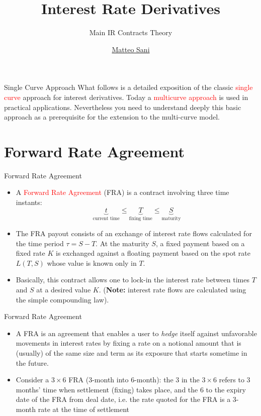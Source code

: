 \documentclass{beamer}
\title{Interest Rate Derivatives}
\subtitle{Main IR Contracts Theory}
\author{\href{mailto:matteo.sani@unisi.it}{Matteo Sani}}
\begin{document}
\begin{frame}[plain]
  \maketitle
\end{frame}

\begin{frame}{Single Curve Approach}
  What follows is a detailed exposition of the classic \textcolor{red}{single curve}
  approach for interest derivatives. Today a \textcolor{red}{multicurve approach} is
  used in practical applications. Nevertheless you need to understand
  deeply this basic approach as a prerequisite for the extension to the
  multi-curve model.
\end{frame}          

\section{Forward Rate Agreement}
\begin{frame}{Forward Rate Agreement}
	\begin{itemize}	
		\item<1-> A \textcolor{red}{Forward Rate Agreement} (FRA) is a contract involving three time instants: %
		\begin{equation*}
			\underbrace{t}_{\text{current time}} \leq \underbrace{T}_{\text{fixing time}} \leq\underbrace{S}_{\text{maturity}}
		\end{equation*}
		\item<2-> The FRA payout consists of an exchange of interest rate flows calculated for the time period $\tau=S-T$. At the maturity $S$, a fixed payment based on a fixed rate $K$ is exchanged against a floating payment based on the spot rate $L(T, S)$ whose value is known only in $T$.
		\item<3-> Basically, this contract allows one to lock-in the interest rate between times $T$ and $S$ at a desired value $K$. (\textbf{Note:} interest rate flows are calculated using the simple compounding law).
	\end{itemize}
\end{frame}

\begin{frame}{Forward Rate Agreement}
	\begin{itemize}
	\item<1-> A FRA is an agreement that enables a user to \emph{hedge} itself against unfavorable movements in interest rates by fixing a rate on a notional amount that is (usually) of the same size and term as its exposure that starts sometime in the future. 
	\item<2-> Consider a $3\times 6$ FRA (3-month into 6-month): the 3 in the $3\times 6$ refers to 3 months' time when settlement (fixing) takes place, and the 6 to the expiry date of the FRA from deal date, i.e. the rate quoted for the FRA is a 3-month rate at the time of settlement
	\end{itemize}
\end{frame}
\end{document}
